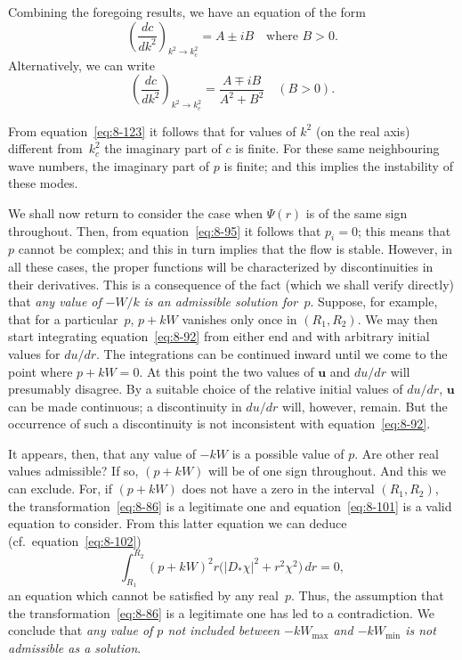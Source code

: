 Combining the foregoing results, we have an equation of the form
\begin{equation}
\label{eq:8-122}
\left(\frac{dc}{dk^2}\right)_{k^2\to k_c^2} = A \pm iB \quad \text{where } B > 0.
\end{equation}
Alternatively, we can write
\begin{equation}
\label{eq:8-123}
\left(\frac{dc}{dk^2}\right)_{k^2\to k_c^2} = \frac{A \mp iB}{A^2+B^2}\quad (B > 0).
\end{equation}

From equation~\eqref{eq:8-123} it follows that for values of $k^2$ (on the real axis) different from~$k_c^2$ the imaginary part of $c$ is finite. For these same neighbouring wave numbers, the imaginary part of $p$ is finite; and this implies the instability of these modes.

We shall now return to consider the case when $\Psi(r)$ is of the same sign throughout. Then, from equation~\eqref{eq:8-95} it follows that $p_i = 0$; this means that $p$ cannot be complex; and this in turn implies that the flow is stable. However, in all these cases, the proper functions will be characterized by discontinuities in their derivatives. This is a consequence of the fact (which we shall verify directly) that \emph{any value of} $-W/k$ \emph{is an admissible solution for~$p$}. Suppose, for example, that for a particular~$p$, $p+kW$ vanishes only once in $(R_1, R_2)$. We may then start integrating equation~\eqref{eq:8-92} from either end and with arbitrary initial values for $du/dr$. The integrations can be continued inward until we come to the point where $p+kW = 0$. At this point the two values of $\mathbf{u}$ and $du/dr$ will presumably disagree. By a suitable choice of the relative initial values of $du/dr$, $\mathbf{u}$ can be made continuous; a discontinuity in $du/dr$ will, however, remain. But the occurrence of such a discontinuity is not inconsistent with equation~\eqref{eq:8-92}.

It appears, then, that any value of $-kW$ is a possible value of $p$. Are other real values admissible? If so, $(p+kW)$ will be of one sign throughout. And this we can exclude. For, if $(p+kW)$ does not have a zero in the interval $(R_1, R_2)$, the transformation~\eqref{eq:8-86} is a legitimate one and equation~\eqref{eq:8-101} is a valid equation to consider. From this latter equation we can deduce (cf.\ equation~\eqref{eq:8-102})
\begin{equation}
\label{eq:8-124}
\int_{R_1}^{R_2} (p+kW)^2 r\bigl(|D_*\chi|^2 + r^2\chi^2\bigr)\,dr = 0,
\end{equation}
an equation which cannot be satisfied by any real~$p$. Thus, the assumption that the transformation~\eqref{eq:8-86} is a legitimate one has led to a contradiction. We conclude that \emph{any value of $p$ not included between $-kW_{\max}$ and $-kW_{\min}$ is not admissible as a solution}.

